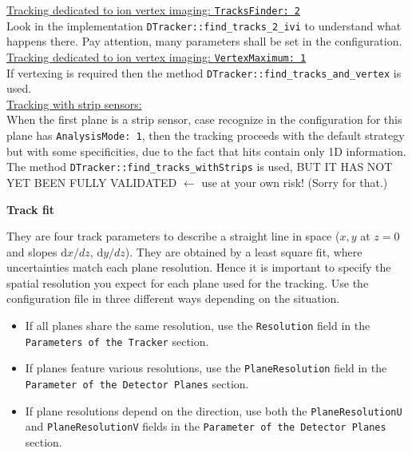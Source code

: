 \documentclass[a4paper, 12pt, twoside]{article}
\begin{document}
\noindent
\hspace{1cm} \underline{Tracking dedicated to ion vertex imaging: {\tt TracksFinder: 2}}\\
\noindent
Look in the implementation {\tt DTracker::find\_tracks\_2\_ivi} to understand what happens there. Pay attention, many parameters shall be set in the configuration.\\

\noindent
\hspace{1cm} \underline{Tracking dedicated to ion vertex imaging: {\tt VertexMaximum: 1}}\\
\noindent
If vertexing is required then the method {\tt DTracker::find\_tracks\_and\_vertex} is used.\\

\noindent
\hspace{1cm} \underline{Tracking with strip sensors:}\\
\noindent
When the first plane is a strip sensor, case recognize in the configuration for this plane has {\tt AnalysisMode: 1}, then the tracking proceeds with the default strategy but with some specificities, due to the fact that hits contain only 1D information. The method {\tt DTracker::find\_tracks\_withStrips} is used, BUT IT HAS NOT YET BEEN FULLY VALIDATED $\leftarrow$ use at your own risk! (Sorry for that.)

\vspace{.8 cm}

\noindent
{\bf Track fit}

\noindent
They are four track parameters to describe a straight line in space ($x, y$ at $z=0$ and slopes ${\mathrm d}x/dz$, ${\mathrm d}y/dz$). They are obtained by a least square fit, where uncertainties match each plane resolution. Hence it is important to specify the spatial resolution you expect for each plane used for the tracking. Use the configuration file in three different ways depending on the situation.\\
\begin{itemize}
\item If all planes share the same resolution, use the {\tt Resolution} field in the {\tt Parameters of the Tracker} section.
\item If planes feature various resolutions, use the {\tt PlaneResolution} field in the {\tt Parameter of the Detector Planes} section.
\item If plane resolutions depend on the direction, use both the {\tt PlaneResolutionU} and {\tt PlaneResolutionV} fields in the {\tt Parameter of the Detector Planes} section.
\end{itemize}
\end{document}
